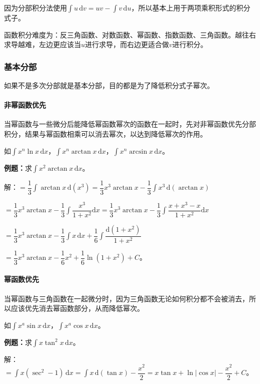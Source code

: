 \documentclass[UTF8, 12pt]{ctexart}
\begin{document}
因为分部积分法使用$\int u\,\textrm{d}v=uv-\int v\,\textrm{d}u$，所以基本上用于两项乘积形式的积分式子。

函数积分难度为：反三角函数、对数函数、幂函数、指数函数、三角函数。越往右求导越难，左边更应该当$u$进行求导，而右边更适合做$v$进行积分。

\subsubsection{基本分部}

如果不是多次分部就是基本分部，目的都是为了降低积分式子幂次。

\paragraph{非幂函数优先} \leavevmode \medskip

当幂函数与一些微分后能降低幂函数幂次的函数在一起时，先对非幂函数优先分部积分，结果与幂函数相乘可以消去幂次，以达到降低幂次的作用。

如$\int x^n\ln x\,\textrm{d}x$，$\int x^n\arctan x\,\textrm{d}x$，$\int x^n\arcsin x\,\textrm{d}x$。

\textbf{例题：}求$\int x^2\arctan x\,\textrm{d}x$。

解：$=\dfrac{1}{3}\int\arctan x\,\textrm{d}(x^3)=\dfrac{1}{3}x^3\arctan x-\dfrac{1}{3}\int x^3\,\textrm{d}(\arctan x)$

$=\dfrac{1}{3}x^3\arctan x-\dfrac{1}{3}\displaystyle{\int\dfrac{x^3}{1+x^2}\textrm{d}x}=\dfrac{1}{3}x^3\arctan x-\dfrac{1}{3}\displaystyle{\int\dfrac{x+x^3-x}{1+x^2}\textrm{d}x}$

$=\dfrac{1}{3}x^3\arctan x-\dfrac{1}{3}\int x\,\textrm{d}x+\displaystyle{\dfrac{1}{6}\int\dfrac{\textrm{d}(1+x^2)}{1+x^2}}$

$=\dfrac{1}{3}x^3\arctan x-\dfrac{1}{6}x^2+\dfrac{1}{6}\ln(1+x^2)+C$。

\paragraph{幂函数优先} \leavevmode \medskip

当幂函数与三角函数在一起微分时，因为三角函数无论如何积分都不会被消去，所以应该优先消去幂函数部分，从而降低幂次。

如$\int x^a\sin x\,\textrm{d}x$，$\int x^a\cos x\,\textrm{d}x$。

\textbf{例题：}求$\int x\tan^2x\,\textrm{d}x$。

解：$=\int x(\sec^2-1)\,\textrm{d}x=\int x\,\textrm{d}(\tan x)-\dfrac{x^2}{2}=x\tan x+\ln\vert\cos x\vert-\dfrac{x^2}{2}+C$。
\end{document}

